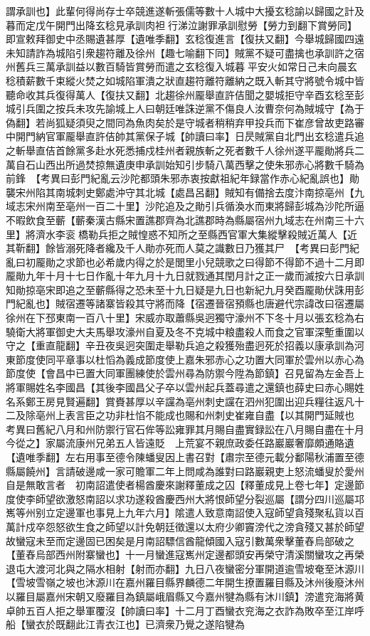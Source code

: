 謂承訓也】此輩何得尚存士卒競進遂斬張儒等數十人城中大擾玄稔諭以歸國之計及暮而定戊午開門出降玄稔見承訓肉袒行涕泣謝罪承訓慰勞【勞力到翻下賞勞同】即宣敕拜御史中丞賜遺甚厚【遺唯季翻】玄稔復進言【復扶又翻】今舉城歸國四遠未知請詐為城陷引衆趨符離及徐州【趣七喻翻下同】賊黨不疑可盡擒也承訓許之宿州舊兵三萬承訓益以數百騎皆賞勞而遣之玄稔復入城暮平安火如常日己未向晨玄稔積薪數千束縱火焚之如城陷軍潰之狀直趨符離符離納之既入斬其守將號令城中皆聽命收其兵復得萬人【復扶又翻】北趨徐州龎舉直許佶聞之嬰城拒守辛酉玄稔至彭城引兵圍之按兵未攻先諭城上人曰朝廷唯誅逆黨不傷良人汝曹奈何為賊城守【為于偽翻】若尚狐疑須臾之間同為魚肉矣於是守城者稍稍弃甲投兵而下崔彦曾故吏路審中開門納官軍龎舉直許佶帥其黨保子城【帥讀曰率】日昃賊黨自北門出玄稔遣兵追之斬舉直佶首餘黨多赴水死悉捕戍桂州者親族斬之死者數千人徐州遂平龎勛將兵二萬自石山西出所過焚掠無遺庚申承訓始知引步騎八萬西擊之使朱邪赤心將數千騎為前鋒　【考異曰彭門紀亂云沙陀都頭朱邪赤衷按獻祖紀年録當作赤心紀亂誤也】勛襲宋州陷其南城刺史鄭處沖守其北城【處昌呂翻】賊知有備捨去度汴南掠亳州【九域志宋州南至亳州一百二十里】沙陀追及之勛引兵循渙水而東將歸彭城為沙陀所逼不暇飲食至蘄【蘄秦漢古縣宋置譙郡齊為北譙郡時為縣屬宿州九域志在州南三十六里】將濟水李衮橋勒兵拒之賊惶惑不知所之至縣西官軍大集縱擊殺賊近萬人【近其靳翻】餘皆溺死降者纔及千人勛亦死而人莫之識數日乃獲其尸　【考異曰彭門紀亂曰初龎勛之求節也必希歲内得之於是閭里小兒競歌之曰得節不得節不過十二月即龎勛九年十月十七日作亂十年九月十九日就戮通其閏月計之正一歲而滅按六日承訓知勛掠亳宋即追之至蘄縣得之恐未至十九日疑是九日也新紀九月癸酉龎勛伏誅用彭門紀亂也】賊宿遷等諸寨皆殺其守將而降【宿遷晉宿預縣也唐避代宗諱改曰宿遷屬徐州在下邳東南一百八十里】宋威亦取蕭縣吳迥獨守濠州不下冬十月以張玄稔為右驍衛大將軍御史大夫馬舉攻濠州自夏及冬不克城中粮盡殺人而食之官軍深塹重圍以守之【重直龍翻】辛丑夜吳迥突圍走舉勒兵追之殺獲殆盡迥死於招義以康承訓為河東節度使同平章事以杜慆為義成節度使上嘉朱邪赤心之功置大同軍於雲州以赤心為節度使【會昌中已置大同軍團練使於雲州尋為防禦今陞為節鎮】召見留為左金吾上將軍賜姓名李國昌【其後李國昌父子卒以雲州起兵蓋尋遣之還鎮也薛史曰赤心賜姓名系鄭王房見賢遍翻】賞賚甚厚以辛讜為亳州刺史讜在泗州犯圍出迎兵糧往返凡十二及除亳州上表言臣之功非杜惂不能成也賜和州刺史崔雍自盡【以其開門延賊也　考異曰舊紀八月和州防禦行官石侔等訟雍罪其月賜自盡實録訟在八月賜自盡在十月今從之】家屬流康州兄弟五人皆遠貶　上荒宴不親庶政委任路巖巖奢靡頗通賂遺【遺唯季翻】左右用事至德令陳蟠叟因上書召對【肅宗至德元載分鄱陽秋浦置至德縣屬饒州】言請破邊咸一家可贍軍二年上問咸為誰對曰路巖親吏上怒流蟠叟於愛州自是無敢言者　初南詔遣使者楊酋慶來謝釋董成之囚【釋董成見上卷七年】定邊節度使李師望欲激怒南詔以求功遂殺酋慶西州大將恨師望分裂巡屬【謂分四川巡屬邛嶲等州别立定邊軍也事見上九年六月】隂遣人致意南詔使入寇師望貪殘聚私貨以百萬計戍卒怨怒欲生食之師望以計免朝廷徵還以太府少卿竇滂代之滂貪殘又甚於師望故蠻寇未至而定邊固已困矣是月南詔驃信酋龍傾國入寇引數萬衆擊董舂烏部破之【董舂烏部西州附寨蠻也】十一月蠻進寇嶲州定邊都頭安再榮守清溪關蠻攻之再榮退屯大渡河北與之隔水相射【射而亦翻】九日八夜蠻密分軍開道逾雪坡奄至沐源川【雪坡雪嶺之坡也沐源川在嘉州羅目縣界麟德二年開生撩置羅目縣及沐州後廢沐州以羅目屬嘉州宋朝又廢羅目為鎮屬峨眉縣又今嘉州犍為縣有沐川鎮】滂遣兖海將黄卓帥五百人拒之舉軍覆沒【帥讀曰率】十二月丁酉蠻衣兖海之衣詐為敗卒至江岸呼船【蠻衣於既翻此江青衣江也】已濟衆乃覺之遂陷犍為